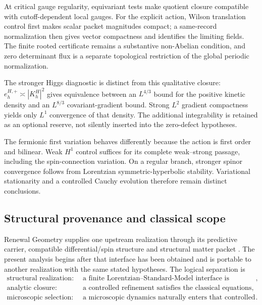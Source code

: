 \documentclass[11pt]{article}
\numberwithin{equation}{section}
\theoremstyle{definition}
\theoremstyle{remark}
\begin{document}
At critical gauge regularity, equivariant tests make quotient closure
compatible with cutoff-dependent local gauges. For the explicit action,
Wilson translation control first makes scalar packet magnitudes compact;
a same-record normalization then gives vector compactness and identifies
the limiting fields. The finite rooted certificate remains a substantive
non-Abelian condition, and zero determinant flux is a separate topological
restriction of the global periodic normalization.

The stronger Higgs diagnostic is distinct from this qualitative closure:
$e_h^{H,+}\asymp|K_h^H|^2$ gives equivalence between an $L^{4/3}$ bound
for the positive kinetic density and an $L^{8/3}$ covariant-gradient bound.
Strong $L^2$ gradient compactness yields only $L^1$ convergence of that
density. The additional integrability is retained as an optional reserve,
not silently inserted into the zero-defect hypotheses.

The fermionic first variation behaves differently because the action is
first order and bilinear. Weak $H^1$ control suffices for its complete
weak--strong passage, including the spin-connection variation. On a regular
branch, stronger spinor convergence follows from Lorentzian
symmetric-hyperbolic stability. Variational stationarity and a controlled
Cauchy evolution therefore remain distinct conclusions.

\subsection{Structural provenance and classical scope}

Renewal Geometry supplies one upstream realization through its predictive
carrier, compatible differential/spin structure and structural matter packet
\cite{PelissierRenewalSpacetime2026,PelissierSpectral2026,PelissierDuality2026}.
The present analysis begins after that interface has been obtained and is
portable to another realization with the same stated hypotheses. The
logical separation is
\begin{equation}
\begin{aligned}
\text{structural realization:}\quad&
\text{a finite Lorentzian--Standard-Model interface is obtained},\\
\text{analytic closure:}\quad&
\text{a controlled refinement satisfies the classical equations},\\
\text{microscopic selection:}\quad&
\text{a microscopic dynamics naturally enters that controlled class}.
\end{aligned}
\label{eq:discussion-three-levels}
\end{equation}
\end{document}
